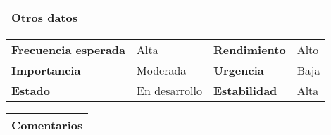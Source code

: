 \documentclass[11pt,a4paper]{article}
\begin{document}
\begin{table}[H]
	\begin{tabularx}{\textwidth}{X}
		\textbf{Otros datos}\\ \hline
	\end{tabularx}

	\begin{tabularx}{\textwidth}{lXlX}
		\textbf{Frecuencia esperada} & Alta & \textbf{Rendimiento} & Alto\\
		\textbf{Importancia} & Moderada & \textbf{Urgencia} & Baja \\
		\textbf{Estado} & En desarrollo & \textbf{Estabilidad} & Alta\\
	\end{tabularx}
	
	\begin{tabularx}{\textwidth}{X}
		\textbf{Comentarios}\\ \hline
	\end{tabularx}
\end{table}

\newpage


\end{document}
